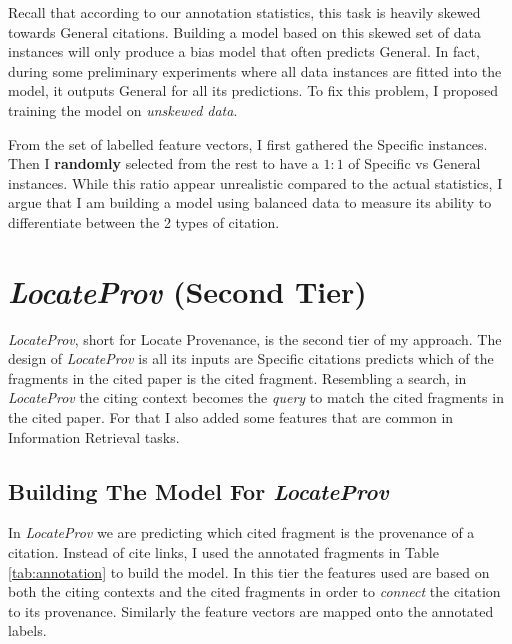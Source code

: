 Recall that according to our annotation statistics, this task is heavily skewed towards General citations. Building a model based on this skewed set of data instances will only produce a bias model that often predicts General. In fact, during some preliminary experiments where all data instances are fitted into the model, it outputs General for all its predictions. To fix this problem, I proposed training the model on {\it unskewed data}.

From the set of labelled feature vectors, I first gathered the Specific instances. Then I {\bf randomly} selected from the rest to have a $1:1$ of Specific vs General instances. While this ratio appear unrealistic compared to the actual statistics, I argue that I am building a model using balanced data to measure its ability to differentiate between the 2 types of citation.

\section{{\it LocateProv} (Second Tier)}
\label{secondtier}
{\it LocateProv}, short for Locate Provenance, is the second tier of my approach. The design of {\it LocateProv} is all its inputs are Specific citations predicts which of the fragments in the cited paper is the cited fragment. Resembling a search, in {\it LocateProv} the citing context becomes the {\it query} to match the cited fragments in the cited paper. For that I also added some features that are common in Information Retrieval tasks.

\subsection*{Building The Model For {\it LocateProv}}
In {\it LocateProv} we are predicting which cited fragment is the provenance of a citation. Instead of cite links, I used the annotated fragments in Table \ref{tab:annotation} to build the model. In this tier the features used are based on both the citing contexts and the cited fragments in order to {\it connect} the citation to its provenance. Similarly the feature vectors are mapped onto the annotated labels.

